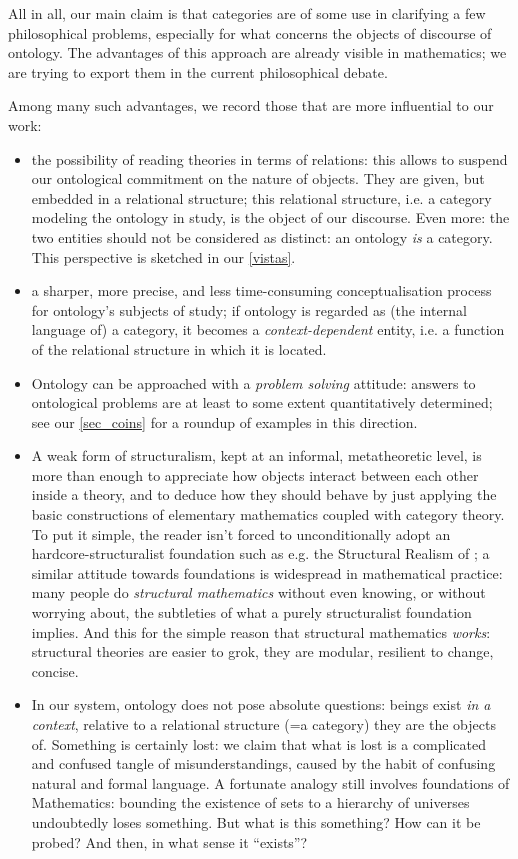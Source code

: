 All in all, our main claim is that categories are of some use in clarifying a few philosophical problems, especially for what concerns the objects of discourse of ontology. The advantages of this approach are already visible in mathematics; we are trying to export them in the current philosophical debate.

Among many such advantages, we record those that are more influential to our work:
\begin{itemize}
	\item the possibility of reading theories in terms of relations: this allows to suspend our ontological commitment on the nature of objects. They are given, but embedded in a relational structure; this relational structure, i.e. a category modeling the ontology in study, is the object of our discourse. Even more: the two entities should not be considered as distinct: an ontology \emph{is} a category. This perspective is sketched in our \autoref{vistas}.
	\item a sharper, more precise, and less time-consuming conceptualisation process for ontology's subjects of study; if ontology is regarded as (the internal language of) a category, it becomes a \emph{context-dependent} entity, i.e. a function of the relational structure in which it is located.
	\item Ontology can be approached with a \emph{problem solving} attitude: answers to ontological problems are at least to some extent quantitatively determined; see our \autoref{sec_coins} for a roundup of examples in this direction.
	\item A weak form of structuralism, kept at an informal, metatheoretic level, is more than enough to appreciate how objects interact between each other inside a theory, and to deduce how they should behave by just applying the basic constructions of elementary mathematics coupled with category theory. To put it simple, the reader isn't forced to unconditionally adopt an hardcore-structuralist foundation such as e.g. the Structural Realism of \cite{bain2013category,eva2016category}; a similar attitude towards foundations is widespread in mathematical practice: many people do \textit{structural mathematics} without even knowing, or without worrying about, the subtleties of what a purely structuralist foundation implies. And this for the simple reason that structural mathematics \emph{works}: structural theories are easier to grok, they are modular, resilient to change, concise.
	\item In our system, ontology does not pose absolute questions: beings exist \emph{in a context}, relative to a relational structure (=a category) they are the objects of. Something is certainly lost: we claim that what is lost is a complicated and confused tangle of misunderstandings, caused by the habit of confusing natural and formal language. A fortunate analogy still involves foundations of Mathematics: bounding the existence of sets to a hierarchy of universes undoubtedly loses something. But what is this something? How can it be probed? And then, in what sense it ``exists''?

\end{itemize}
